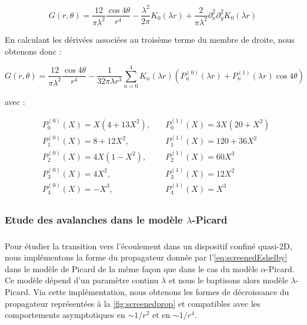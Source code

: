 \begin{equation}
    G(r,\theta) = \frac{12}{\pi\lambda^2}\frac{\cos 4\theta}{r^4}-\frac{\lambda^2}{2\pi}K_0(\lambda r)+\frac{2}{\pi\lambda^2}\partial_x^2\partial_y^2K_0(\lambda r)
\end{equation}

\noindent En calculant les dérivées associées au troisème terme du membre de droite, nous obtenons donc :

\begin{equation}
    G(r,\theta) = \frac{12}{\pi\lambda^2}\frac{\cos 4\theta}{r^4} - \frac{1}{32\pi\lambda r^3}\sum_{n=0}^{4}K_n(\lambda r)\left(P_n^{(0)}(\lambda r) + P_n^{(1)}(\lambda r)\cos 4\theta\right)
\end{equation}

\noindent avec :

\begin{equation}
    \begin{aligned}
        &P_0^{(0)}(X) = X(4+13X^2), \quad &P_0^{(1)}(X) = 3X(20+X^2)\\
        &P_1^{(0)}(X) = 8+12X^2,\quad &P_1^{(1)}(X) = 120+36X^2\\
        &P_2^{(0)}(X) = 4X(1-X^2),\quad &P_2^{(1)}(X) = 60X^3\\
        &P_3^{(0)}(X) = 4X^2,\quad &P_3^{(1)}(X) = 12X^2\\
        &P_4^{(0)}(X) = -X^3,\quad &P_4^{(1)}(X) = X^3\\
    \end{aligned}
\end{equation}

\subsubsection{Etude des avalanches dans le modèle $\lambda$-Picard}

\label{sec:screenedav}

\subparagraph{}Pour étudier la transition vers l'écoulement dans un dispositif confiné quasi-2D, nous implémentons la forme du propagateur donnée par l'\autoref{eq:screenedEshelby} dans le modèle de Picard de la même façon que dans le cas du modèle $\alpha$-Picard. Ce modèle dépend d'un paramètre continu $\lambda$ et nous le baptisons alors modèle $\lambda$-Picard. Via cette implémentation, nous obtenons les formes de décroissance du propagateur représentées à la \autoref{fig:screenedprop} et compatibles avec les comportements asymptotiques en $\sim 1/r^2$ et en $\sim 1/r^4$.

